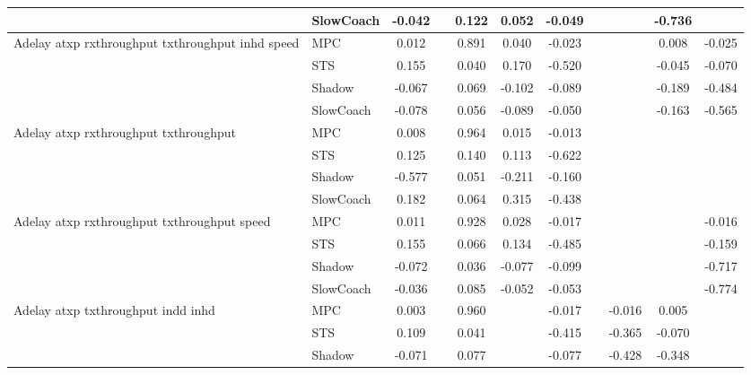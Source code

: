 \begin{tabular}{|l|l|*{9}{c|}}
                              & SlowCoach &   -0.042 &        &     0.122 &  0.052 & -0.049 &     &      &  -0.736 &       \\
\midrule
Adelay atxp rxthroughput txthroughput inhd speed    & MPC &    0.012 &        &     0.891 &  0.040 & -0.023 &     &      &   0.008 &   -0.025 \\
                              & STS &    0.155 &        &     0.040 &  0.170 & -0.520 &     &      &  -0.045 &   -0.070 \\
                              & Shadow &   -0.067 &        &     0.069 & -0.102 & -0.089 &     &      &  -0.189 &   -0.484 \\
                              & SlowCoach &   -0.078 &        &     0.056 & -0.089 & -0.050 &     &      &  -0.163 &   -0.565 \\
\midrule
Adelay atxp rxthroughput txthroughput    & MPC &    0.008 &        &     0.964 &  0.015 & -0.013 &     &      &      &       \\
                              & STS &    0.125 &        &     0.140 &  0.113 & -0.622 &     &      &      &       \\
                              & Shadow &   -0.577 &        &     0.051 & -0.211 & -0.160 &     &      &      &       \\
                              & SlowCoach &    0.182 &        &     0.064 &  0.315 & -0.438 &     &      &      &       \\
\midrule
Adelay atxp rxthroughput txthroughput speed    & MPC &    0.011 &        &     0.928 &  0.028 & -0.017 &     &      &      &   -0.016 \\
                              & STS &    0.155 &        &     0.066 &  0.134 & -0.485 &     &      &      &   -0.159 \\
                              & Shadow &   -0.072 &        &     0.036 & -0.077 & -0.099 &     &      &      &   -0.717 \\
                              & SlowCoach &   -0.036 &        &     0.085 & -0.052 & -0.053 &     &      &      &   -0.774 \\
\midrule
Adelay atxp txthroughput indd inhd    & MPC &    0.003 &        &     0.960 &     & -0.017 &     &  -0.016 &   0.005 &       \\
                              & STS &    0.109 &        &     0.041 &     & -0.415 &     &  -0.365 &  -0.070 &       \\
                              & Shadow &   -0.071 &        &     0.077 &     & -0.077 &     &  -0.428 &  -0.348 &       \\

\end{tabular}
